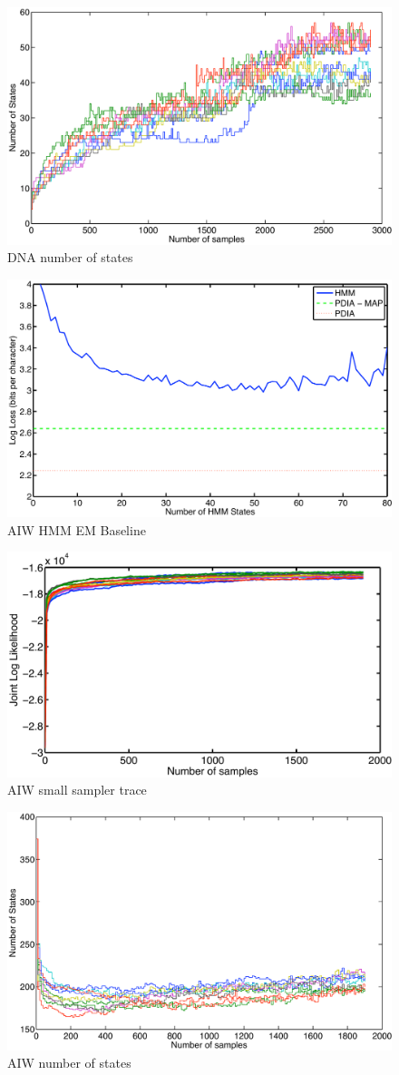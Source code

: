 \begin{figure}[htbp]
\begin{center}
\includegraphics[width=.5\textwidth]{results/dna_numstates}
\caption{DNA number of states}
\label{fig:dna_numstates}
\end{center}
\end{figure}

\begin{figure}[htbp]
\begin{center}
\includegraphics[width=.5\textwidth]{results/aiw_small_hmm}
\caption{AIW HMM EM Baseline}
\label{fig:aiw_small_hmm}
\end{center}
\end{figure}

\begin{figure}[htbp]
\begin{center}
\includegraphics[width=.5\textwidth]{results/aiw_small_sampler}
\caption{AIW small sampler trace }
\label{fig:aiw_small_sampler}
\end{center}
\end{figure}

\begin{figure}[htbp]
\begin{center}
\includegraphics[width=.5\textwidth]{results/aiw_small_numstates}
\caption{AIW number of states}
\label{fig:aiw_small_numstates}
\end{center}
\end{figure}

